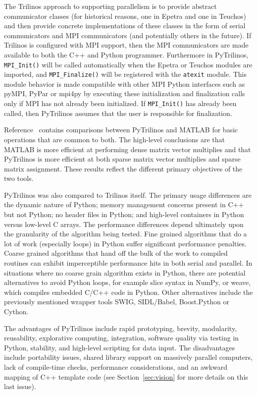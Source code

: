 \documentclass[11pt]{article}
\begin{document}
The Trilinos approach to supporting parallelism is to provide abstract communicator classes (for historical reasons, one in Epetra and one in Teuchos) and then provide concrete implementations of these classes in the form of serial communicators and MPI communicators (and potentially others in the future).  If Trilinos is configured with MPI support, then the MPI communicators are made available to both the C++ and Python programmer.  Furthermore in PyTrilinos, {\tt MPI\_Init()} will be called automatically when the Epetra or Teuchos modules are imported, and {\tt MPI\_Finalize()} will be registered with the {\tt atexit} module.  This module behavior is made compatible with other MPI Python interfaces such as pyMPI, PyPar or mpi4py by executing these initialization and finalization calls only if MPI has not already been initialized.  If {\tt MPI\_Init()} has already been called, then PyTrilinos assumes that the user is responsible for finalization.

Reference~\cite{PyTrilinos} contains comparisons between PyTrilinos and MATLAB for basic operations that are common to both.  The high-level conclusions are that MATLAB is more efficient at performing dense matrix vector multiplies and that PyTrilinos is more efficient at both sparse matrix vector multiplies and sparse matrix assignment.  These results reflect the different primary objectives of the two tools.

PyTrilinos was also compared to Trilinos itself.  The primary usage differences are the dynamic nature of Python; memory management concerns present in C++ but not Python; no header files in Python; and high-level containers in Python versus low-level C arrays.  The performance differences depend ultimately upon the granularity of the algorithm being tested.  Fine grained algorithms that do a lot of work (especially loops) in Python suffer significant performance penalties.  Coarse grained algorithms that hand off the bulk of the work to compiled routines can exhibit imperceptible performance hits in both serial and parallel.  In situations where no coarse grain algorithm exists in Python, there are potential alternatives to avoid Python loops, for example slice syntax in NumPy, or weave, which compiles embedded C/C++ code in Python.  Other alternatives include the previously mentioned wrapper tools SWIG, SIDL/Babel, Boost.Python or Cython.

The advantages of PyTrilinos include rapid prototyping, brevity, modularity, reusability, explorative computing, integration, software quality via testing in Python, stability, and high-level scripting for data input.  The disadvantages include portability issues, shared library support on massively parallel computers, lack of compile-time checks, performance considerations, and an awkward mapping of C++ template code (see Section~\ref{sec:vision} for more details on this last issue).
\end{document}
